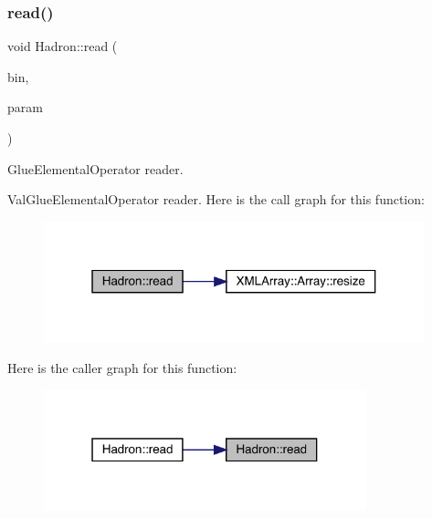 \subsubsection{\texorpdfstring{read()}{read()}\hspace{0.1cm}{\footnotesize\ttfamily [65/94]}}
{\footnotesize\ttfamily void Hadron\+::read (\begin{DoxyParamCaption}\item[{\mbox{\hyperlink{classADATIO_1_1BinaryReader}{Binary\+Reader}} \&}]{bin,  }\item[{\mbox{\hyperlink{structHadron_1_1ValGlueElementalOperator__t}{Val\+Glue\+Elemental\+Operator\+\_\+t}} \&}]{param }\end{DoxyParamCaption})}



Glue\+Elemental\+Operator reader. 

Val\+Glue\+Elemental\+Operator reader. Here is the call graph for this function\+:\nopagebreak
\begin{figure}[H]
\begin{center}
\leavevmode
\includegraphics[width=313pt]{d1/daf/namespaceHadron_a9991ac06f4136479286a214307cd17dc_cgraph}
\end{center}
\end{figure}
Here is the caller graph for this function\+:\nopagebreak
\begin{figure}[H]
\begin{center}
\leavevmode
\includegraphics[width=265pt]{d1/daf/namespaceHadron_a9991ac06f4136479286a214307cd17dc_icgraph}
\end{center}
\end{figure}
\mbox{\label{namespaceHadron_a6860ee691eb6d64d0fb2d52f4977316b}} 
